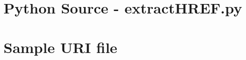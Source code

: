 \documentclass[letterpaper,11pt]{report}
\begin{document}



\appendix
{}

\chapter{Python Source - extractHREF.py} \label{chap:extractHREF}

\chapter{Sample URI file} \label{chap:file1}

\end{document}
